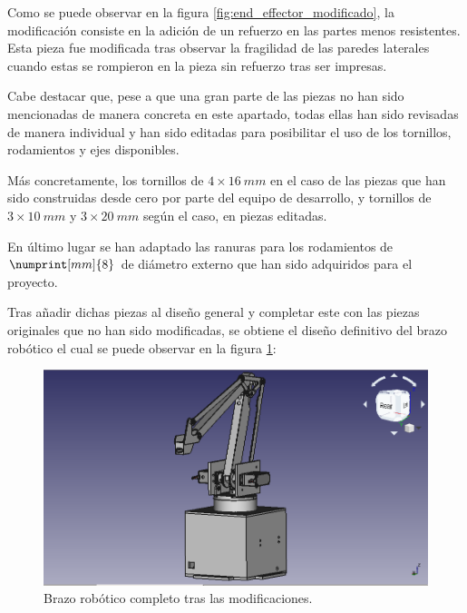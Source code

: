 Como se puede observar en la figura \ref{fig:end_effector_modificado}, la modificación consiste en la adición de un refuerzo en las partes menos resistentes. 
Esta pieza fue modificada tras observar la fragilidad de las paredes laterales cuando estas se rompieron en la pieza sin refuerzo tras ser impresas.

Cabe destacar que, pese a que una gran parte de las piezas no han sido mencionadas de manera concreta en este apartado, todas ellas han sido revisadas de manera individual y han sido editadas para posibilitar el uso de los tornillos, rodamientos y ejes disponibles.

Más concretamente, los tornillos de $4 \times 16~mm$ en el caso de las piezas que han sido construidas desde cero por parte del equipo de desarrollo, y tornillos de $3 \times 10~mm$ y $3 \times 20~mm$ según el caso, en piezas editadas.

En último lugar se han adaptado las ranuras para los rodamientos de $\numprint[mm]{8}$ de diámetro externo que han sido adquiridos para el proyecto.

Tras añadir dichas piezas al diseño general y completar este con las piezas originales que no han sido modificadas, se obtiene el diseño definitivo del brazo robótico el cual se puede observar en la figura \ref{fig:brazo_completo_modificado}:

\begin{figure}[H]
    \centering
    \includegraphics[width=.9\linewidth]{pictures/BrazoEntero.png}
    \caption{Brazo robótico completo tras las modificaciones.}
    \label{fig:brazo_completo_modificado}
\end{figure}